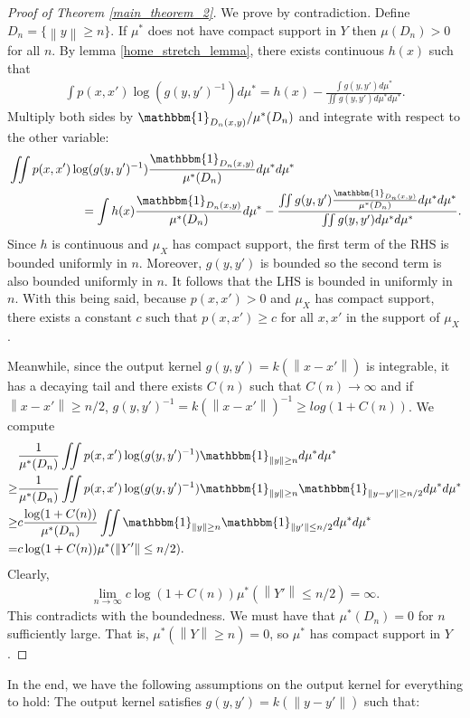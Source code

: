 \documentclass[10pt]{article}
\newcommand{\norm}[1]{\left\lVert#1\right\rVert}
\newenvironment{Proof of lemma}{\noindent{\bf Proof of Lemma}}{\hfill$\Box$\newline}
\newenvironment{Proof of claim}{\noindent{\bf Proof of claim}}{\hfill$\Box$\newline}
\newenvironment{Proof of theorem}{\noindent{\bf Proof of Theorem}}{\hfill\scriptsize{$\Box$}\newline}
\newenvironment{Proof of theorems}{\noindent{\bf Proof of Theorems}}{\hfill$\Box$\newline}
\newenvironment{Proof of proposition}{\noindent{\bf Proof of Proposition}}{\hfill$\Box$\newline}
\newenvironment{Proof of propositions}{\noindent{\bf Proof of Propositions}}{\hfill$\Box$\newline}
\newenvironment{Proof of exercise}{\noindent{\it Proof of Exercise:}}{\hfill$\Box$}
\numberwithin{equation}{section}
\begin{document}
\begin{proof}[Proof of Theorem \ref{main_theorem_2}]
    We prove by contradiction. Define $D_n = \{\norm{y} \geq n\}$. If $\mu^*$ does not have compact support in $Y$ then $\mu(D_n)>0$ for all $n$. By lemma \ref{home_stretch_lemma}, there exists continuous $h(x)$ such that
    \begin{align}
        \int p(x,x') \log(g(y,y')^{-1})d\mu^* = h(x) -  \frac{\int g(y,y')d\mu^*}{\iint g(y,y')d\mu^* d\mu^*}.
    \end{align}
    Multiply both sides by $\mathbbm{1}_{D_n(x,y)}/\mu^*(D_n)$ and integrate with respect to the other variable:
    \begin{align}
         & \iint p(x,x') \log(g(y,y')^{-1}) \frac{\mathbbm{1}_{D_n(x,y)}}{\mu^*(D_n)}d\mu^* d\mu^* \nonumber                                                                                          \\
         & \qquad \qquad \qquad= \int h(x)\frac{\mathbbm{1}_{D_n(x,y)}}{\mu^*(D_n)}d\mu^* -  \frac{\iint g(y,y')\frac{\mathbbm{1}_{D_n(x,y)}}{\mu^*(D_n)} d\mu^* d\mu^*}{\iint g(y,y')d\mu^* d\mu^*}.
    \end{align}
    Since $h$ is continuous and $\mu_X$ has compact support, the first term of the RHS is bounded uniformly in $n$. Moreover, $g(y,y')$  is bounded so the second term is also bounded uniformly in $n$. It follows that the LHS is bounded in uniformly in $n$. With this being said, because $p(x,x')>0$ and $\mu_X$ has compact support, there exists a constant $c$ such that $p(x,x') \geq c$ for all $x,x'$ in the support of $\mu_X$.

    Meanwhile, since the output kernel $g(y,y') = k(\norm{x-x'})$ is integrable, it
    has a decaying tail and there exists $C(n)$ such that $C(n) \to \infty$ and if
    $\norm{x-x'} \geq n/2$, $g(y,y')^{-1}=k(\norm{x-x'})^{-1} \geq log (1+C(n))$.
    We compute
    \begin{align}
             & \frac{1}{\mu^*(D_n)} \iint p(x,x') \log(g(y,y')^{-1}) \mathbbm{1}_{\norm{y} \geq n} d\mu^* d\mu^* \nonumber                                   \\
        \geq & \frac{1}{\mu^*(D_n)} \iint p(x,x') \log(g(y,y')^{-1}) \mathbbm{1}_{\norm{y} \geq n} \mathbbm{1}_{\norm{y-y'} \geq n/2}d\mu^* d\mu^* \nonumber \\
        \geq & c \frac{\log(1+C(n))}{\mu^*(D_n)} \iint \mathbbm{1}_{\norm{y} \geq n} \mathbbm{1}_{\norm{y'} \leq n/2}d\mu^* d\mu^* \nonumber                 \\
        =    & c\log(1+C(n)) \mu^*(\norm{Y'}\leq n/2).
    \end{align}
    Clearly,
    \begin{align}
        \lim_{n \to \infty} c\log(1+C(n)) \mu^*(\norm{Y'}\leq n/2) = \infty.
    \end{align}
    This contradicts with the boundedness. We must have that $\mu^*(D_n)=0$ for $n$ sufficiently large. That is, $\mu^*(\norm{Y} \geq n)=0$, so $\mu^*$ has compact support in $Y$.
\end{proof}
In the end, we have the following assumptions on the output kernel for everything to hold:
The output kernel satisfies $g(y,y') = k (\norm{y-y'})$ such that:
\end{document}
